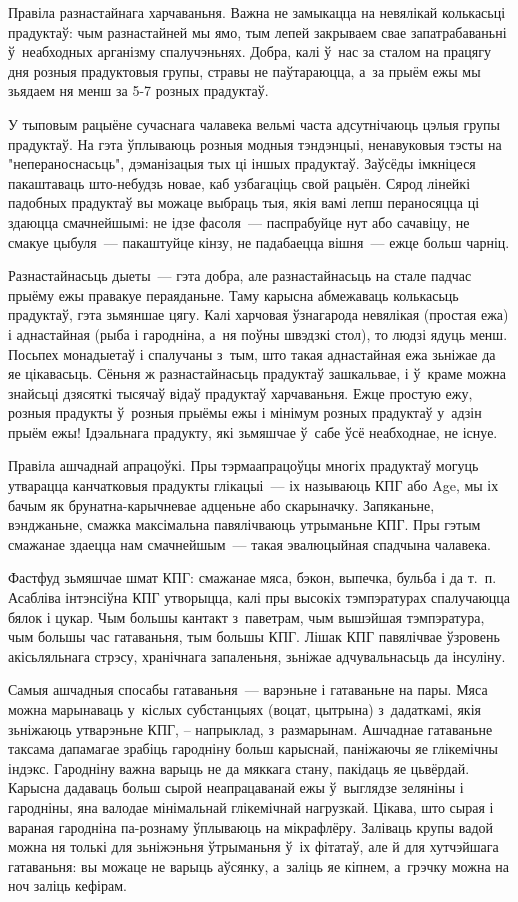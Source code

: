Правіла разнастайнага харчаваньня. Важна не замыкацца на невялікай колькасьці прадуктаў: чым разнастайней мы ямо, тым лепей закрываем свае запатрабаваньні ў~неабходных арганізму спалучэньнях. Добра, калі ў~нас за сталом на працягу дня розныя прадуктовыя групы, стравы не паўтараюцца, а~за прыём ежы мы зьядаем ня менш за 5-7 розных прадуктаў.

У тыповым рацыёне сучаснага чалавека вельмі часта адсутнічаюць цэлыя групы прадуктаў. На гэта ўплываюць розныя модныя тэндэнцыі, ненавуковыя тэсты на "непераноснасьць", дэманізацыя тых ці іншых прадуктаў. Заўсёды імкніцеся пакаштаваць што-небудзь новае, каб узбагаціць свой рацыён. Сярод лінейкі падобных прадуктаў вы можаце выбраць тыя, якія вамі лепш пераносяцца ці здаюцца смачнейшымі: не ідзе фасоля~--- паспрабуйце нут або сачавіцу, не смакуе цыбуля~--- пакаштуйце кінзу, не падабаецца вішня~--- ежце больш чарніц.

Разнастайнасьць дыеты~--- гэта добра, але разнастайнасьць на стале падчас прыёму ежы правакуе пераяданьне. Таму карысна абмежаваць колькасьць прадуктаў, гэта зьмяншае цягу. Калі харчовая ўзнагарода невялікая (простая ежа) і аднастайная (рыба і гародніна, а~ня поўны швэдзкі стол), то людзі ядуць менш. Посьпех монадыетаў і спалучаны з~тым, што такая аднастайная ежа зьніжае да яе цікавасьць. Сёньня ж разнастайнасьць прадуктаў зашкальвае, і ў~краме можна знайсьці дзясяткі тысячаў відаў прадуктаў харчаваньня. Ежце простую ежу, розныя прадукты ў~розныя прыёмы ежы і мінімум розных прадуктаў у~адзін прыём ежы! Ідэальнага прадукту, які зьмяшчае ў~сабе ўсё неабходнае, не існуе.

Правіла ашчаднай апрацоўкі. Пры тэрмаапрацоўцы многіх прадуктаў могуць утварацца канчатковыя прадукты глікацыі~--- іх называюць КПГ або Age, мы іх бачым як брунатна-карычневае адценьне або скарыначку. Запяканьне, вэнджаньне, смажка максімальна павялічваюць утрыманьне КПГ. Пры гэтым смажанае здаецца нам смачнейшым~--- такая эвалюцыйная спадчына чалавека.

Фастфуд зьмяшчае шмат КПГ: смажанае мяса, бэкон, выпечка, бульба і да т.~п. Асабліва інтэнсіўна КПГ утворыцца, калі пры высокіх тэмпэратурах спалучаюцца бялок і цукар. Чым большы кантакт з~паветрам, чым вышэйшая тэмпэратура, чым большы час гатаваньня, тым большы КПГ. Лішак КПГ павялічвае ўзровень акісьляльнага стрэсу, хранічнага запаленьня, зьніжае адчувальнасьць да інсуліну.

Самыя ашчадныя спосабы гатаваньня~--- варэньне і гатаваньне на пары. Мяса можна марынаваць у~кіслых субстанцыях (воцат, цытрына) з~дадаткамі, якія зьніжаюць утварэньне КПГ, -- напрыклад, з~размарынам. Ашчаднае гатаваньне таксама дапамагае зрабіць гародніну больш карыснай, паніжаючы яе глікемічны індэкс. Гародніну важна варыць не да мяккага стану, пакідаць яе цьвёрдай. Карысна дадаваць больш сырой неапрацаванай ежы ў~выглядзе зеляніны і гародніны, яна валодае мінімальнай глікемічнай нагрузкай. Цікава, што сырая і вараная гародніна па-рознаму ўплываюць на мікрафлёру. Заліваць крупы вадой можна ня толькі для зьніжэньня ўтрыманьня ў~іх фітатаў, але й для хутчэйшага гатаваньня: вы можаце не варыць аўсянку, а~заліць яе кіпнем, а~грэчку можна на ноч заліць кефірам.

